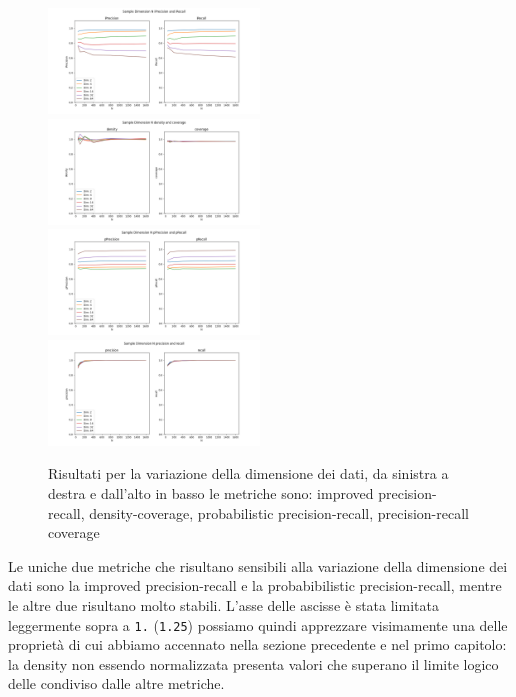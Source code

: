 \begin{figure}[!ht]
    \includegraphics[width=0.5\textwidth]{../images/toyexperiments/ksampledim/sampleDimN_iPrecision_iRecall.png} 
    \includegraphics[width=0.5\textwidth]{../images/toyexperiments/ksampledim/sampleDimN_density_coverage.png} 
    \includegraphics[width=0.5\textwidth]{../images/toyexperiments/ksampledim/sampleDimN_pPrecision_pRecall.png} 
    \includegraphics[width=0.5\textwidth]{../images/toyexperiments/ksampledim/sampleDimN_precision_recall.png} 
    \caption{Risultati per la variazione della dimensione dei dati, da sinistra a destra e dall'alto in basso le metriche sono: improved precision-recall, density-coverage, probabilistic precision-recall, precision-recall coverage}
\end{figure}

Le uniche due metriche che risultano sensibili alla variazione della dimensione dei dati sono la improved precision-recall e la probabibilistic precision-recall, mentre le altre due risultano molto stabili.
L'asse delle ascisse è stata limitata leggermente sopra a \texttt{1.} (\texttt{1.25}) possiamo quindi apprezzare visimamente una delle proprietà di cui abbiamo accennato nella sezione precedente e nel primo capitolo:
la density non essendo normalizzata presenta valori che superano il limite logico delle condiviso dalle altre metriche.

